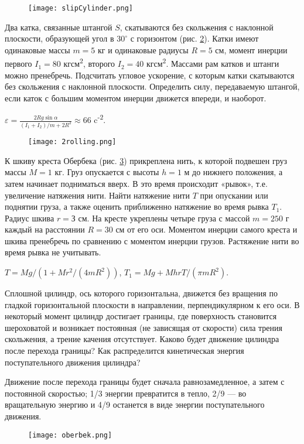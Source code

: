 \begin{figure}[h]
\centering
\texttt{[image: slipCylinder.png]}
\caption{}
\label{slipCylinder}
\end{figure}

\begin{ex} %
Два катка, связанные штангой $S$, скатываются без скольжения с наклонной плоскости, образующей угол в $30^{\circ}$ с горизонтом (рис. \ref{2rolling}). Катки имеют одинаковые массы $m = 5$ кг и одинаковые радиусы $R = 5$ см, момент инерции первого $I_1 = 80$ кгсм\textsuperscript{2}, второго $I_2 = 40$ кгсм\textsuperscript{2}. Массами рам катков и штанги можно пренебречь. Подсчитать угловое ускорение, с которым катки скатываются без скольжения с наклонной плоскости. Определить силу, передаваемую штангой, если каток с большим моментом инерции движется впереди, и наоборот.
\begin{ans}
$\varepsilon = \frac{2Rg \sin \alpha}{(I_1 + I_2)/m + 2R^2} \approx 66$ c\textsuperscript{-2}.
\end{ans}
\end{ex}	

\begin{figure}[h]
\centering
\texttt{[image: 2rolling.png]}
\caption{}
\label{2rolling}
\end{figure}

\begin{ex} %
К шкиву креста Обербека (рис. \ref{oberbek}) прикреплена нить, к которой подвешен груз массы $M = 1$ кг. Груз опускается с высоты $h = 1$ м до нижнего положения, а затем начинает подниматься вверх. В это время происходит «рывок», т.е. увеличение натяжения нити. Найти натяжение нити $T$ при опускании или поднятии груза, а также оценить приближенно натяжение во время рывка $T_1$. Радиус шкива $r = З$ см. На кресте укреплены четыре груза с массой $m = 250$ г каждый на расстоянии $R = 30$ см от его оси. Моментом инерции самого креста и шкива пренебречь по сравнению с моментом инерции грузов. Растяжение нити во время рывка не учитывать.
\begin{ans}
$T = Mg/(1 + Mr^2/(4mR^2))$, $T_1 = Mg + MhrT/(\pi m R^2)$.
\end{ans}
\end{ex}	

\begin{ex} %
Сплошной цилиндр, ось которого горизонтальна, движется без вращения по гладкой горизонтальной плоскости в направлении, перпендикулярном к его оси. В некоторый момент цилиндр достигает границы, где поверхность становится шероховатой и возникает постоянная (не зависящая от скорости) сила трения скольжения, а трение качения отсутствует. Каково будет движение цилиндра после перехода границы? Как распределится кинетическая энергия поступательного движения цилиндра?
\begin{ans}
Движение после перехода границы будет сначала равнозамедленное, а затем с постоянной скоростью; 1/3 энергии превратится в тепло, 2/9 — во вращательную энергию и 4/9 останется в виде энергии поступательного движения.
\end{ans}
\end{ex}	

\begin{figure}[h]
\centering
\texttt{[image: oberbek.png]}
\caption{}
\label{oberbek}
\end{figure}

\clearpage